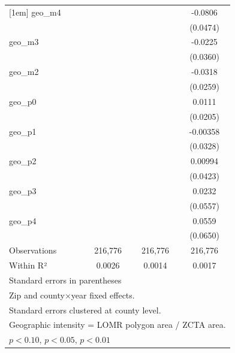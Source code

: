 \begin{table}[htbp]
\begin{tabular}{l*{3}{c}}
[1em]
geo\_m4              &                     &                     &     -0.0806\sym{*}  \\
                    &                     &                     &    (0.0474)         \\
[1em]
geo\_m3              &                     &                     &     -0.0225         \\
                    &                     &                     &    (0.0360)         \\
[1em]
geo\_m2              &                     &                     &     -0.0318         \\
                    &                     &                     &    (0.0259)         \\
[1em]
geo\_p0              &                     &                     &      0.0111         \\
                    &                     &                     &    (0.0205)         \\
[1em]
geo\_p1              &                     &                     &    -0.00358         \\
                    &                     &                     &    (0.0328)         \\
[1em]
geo\_p2              &                     &                     &     0.00994         \\
                    &                     &                     &    (0.0423)         \\
[1em]
geo\_p3              &                     &                     &      0.0232         \\
                    &                     &                     &    (0.0557)         \\
[1em]
geo\_p4              &                     &                     &      0.0559         \\
                    &                     &                     &    (0.0650)         \\
\hline
Observations        &     216,776         &     216,776         &     216,776         \\
Within R²           &      0.0026         &      0.0014         &      0.0017         \\
\hline\hline
\multicolumn{4}{l}{\footnotesize Standard errors in parentheses}\\
\multicolumn{4}{l}{\footnotesize Zip and county×year fixed effects.}\\
\multicolumn{4}{l}{\footnotesize Standard errors clustered at county level.}\\
\multicolumn{4}{l}{\footnotesize Geographic intensity = LOMR polygon area / ZCTA area.}\\
\multicolumn{4}{l}{\footnotesize \sym{*} \(p<0.10\), \sym{**} \(p<0.05\), \sym{***} \(p<0.01\)}\\
\end{tabular}
\end{table}
